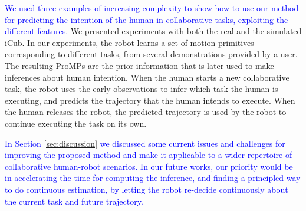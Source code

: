 \documentclass[utf8]{frontiersSCNS} %
\newcommand{\rev}[1]{\textcolor{blue}{#1}}
\begin{document}
\rev{We used three examples of increasing complexity to show how to use our method for predicting the intention of the human in collaborative tasks, exploiting the different features. } 
We presented experiments with both the real and the simulated iCub. In our experiments, the robot learns a set of motion primitives corresponding to different tasks, from several demonstrations provided by a user. The resulting ProMPs are the prior information that is later used to make inferences about human intention.
When the human starts a new collaborative task, the robot uses the early observations to infer which task the human is executing, and predicts the trajectory that the human intends to execute. When the human releases the robot, the predicted trajectory is used by the robot to continue executing the task on its own.

\rev{In Section \ref{sec:discussion} we discussed some current issues and challenges for improving the proposed method and make it applicable to a wider repertoire of collaborative human-robot scenarios. In our future works, our priority would be in accelerating the time for computing the inference, and finding a principled way to do continuous estimation, by letting the robot re-decide continuously about the current task and future trajectory.
}

\end{document}

